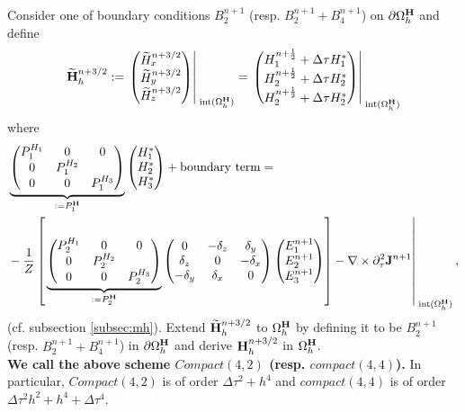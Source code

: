 \documentclass[12pt,reqno]{amsart}
\newcommand{\h}{{\bf H}}
\newcommand{\J}{{\bf J}}
\theoremstyle{definition}
\numberwithin{equation}{section}
\newcommand{\intr}[1]{\mathrm{int}(#1)}
\def\Gwh{\Omega_h}
\begin{document}
	Consider one of  boundary conditions $B_2^{n+1}$ (resp. $B_2^{n+1}+B_4^{n+1}$) on
 $\partial \Gwh^\h$
and define
	$$
	\widetilde{\h}_h^{n+3/2}:=
	\left.
	\begin{pmatrix}
		\widetilde{H}_x^{n+3/2}\\
		\widetilde{H}_y^{n+3/2}\\
		\widetilde{H}_z^{n+3/2}
	\end{pmatrix}\right|_{\; \intr{\Gwh^{\h}}}^{\;}=
\left.
	\begin{pmatrix}
		H_1^{n+\frac{1}{2}}+\Delta \tau H_1^{*}\\
		H_2^{n+\frac{1}{2}}+\Delta \tau H_2^{*}\\
		H_2^{n+\frac{1}{2}}+\Delta \tau H_2^{*}
	\end{pmatrix}\right|_{\; \intr{\Gwh^{\h}}}^{\;}
	$$
	where 
	\begin{align*}
		&
	\underbrace{
	\begin{pmatrix}
		P_1^{H_1}  & 0&0 \\
		0 & 	P_1^{H_2}  &\\
		0&0&	P_1^{H_3} 
	\end{pmatrix}
}_{:=P_1^\h}
	\begin{pmatrix}
		H_1^{*}\\
		H_2^{*} \\
		H_3^{*}
	\end{pmatrix}+\mathrm{boundary \ term}
=\\&
-\frac{1}{Z}
\left[ \left.
	\underbrace{
	\begin{pmatrix}
		P_2^{H_1} & 0&0 \\
		0 & P_2^{H_2} &\\
		0&0&P_2^{H_3} 
	\end{pmatrix}
}_{:=P_2^\h}
	\begin{pmatrix}
		0& -\delta_z & \delta _y\\
		\delta_z&0&-\delta_x\\
		-\delta_y&\delta_x&0\\
	\end{pmatrix}
	\begin{pmatrix}
		E_1^{n+1}\\
		E_2^{n+1}\\
		E_3^{n+1}
	\end{pmatrix}\right]	-\nabla\times\partial_{\tau}^2\J^{n+1}\right|_{\; \intr{\Gwh^{\h}}}^{\;},
\end{align*}
(cf. subsection \ref{subsec:mh}).
		Extend $\widetilde{\h}_h^{n+3/2}$ 
	to $\Gwh^\h$ by defining it to be 
$B_2^{n+1}$ (resp. $B_2^{n+1}+B_4^{n+1}$)
	in  $\partial \Gwh^\h$
	and derive $\h_h^{n+3/2}$ in $\Gwh^\h$. \\[2mm]
{\bf We call the above scheme $Compact(4,2)$ (resp. $compact(4,4)$).}
In particular, $Compact(4,2)$ is of order $\Delta \tau^2+h^4$ and 
$compact(4,4)$ is of order $\Delta\tau^2h^2+h^4+\Delta \tau^4$.
\end{document}
